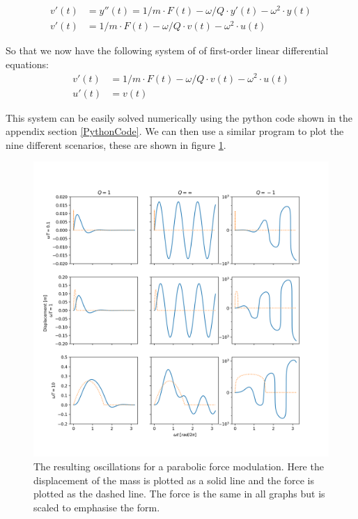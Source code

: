 \begin{align*}
    v'(t) &= y''(t) = 1/m \cdot F(t) - \omega/Q\cdot y'(t)-\omega^2\cdot y(t)\\
    v'(t) &= 1/m\cdot F(t) - \omega/Q\cdot v(t)-\omega^2\cdot u(t)
\end{align*}

So that we now have the following system of of first-order linear differential equations:\\

\begin{align}
    v'(t) &= 1/m\cdot F(t)-\omega/Q\cdot v(t)- \omega^2\cdot u(t)\\
    u'(t) &= v(t)
\end{align}

This system can be easily solved numerically using the python code shown in the appendix section \ref{PythonCode}. We can then use a similar program to plot the nine different scenarios, these are shown in figure \ref{fig:fig_Q3}.\\
\newpage

\begin{figure}[!h]
    \centering
    \includegraphics[width=.7\linewidth,keepaspectratio]{figures/Q3_omega_q_plot.png}
    \caption{The resulting oscillations for a parabolic force modulation. Here the displacement of the mass is plotted as a solid line and the force is plotted as the dashed line. The force is the same in all graphs but is scaled to emphasise the form. }
    \label{fig:fig_Q3}
\end{figure}

